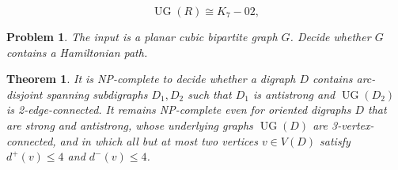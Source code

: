\documentclass[10pt,a4paper]{amsart}
\newtheorem{problem}{Problem}
\newtheorem{theorem}{Theorem}
\newcommand{\UG}{\operatorname{UG}}
\begin{document}
\begin{equation}\label{eq:underlying-core}
   \UG(R)\cong K_7-02,
\end{equation}

\begin{problem}
\label{prob:PCBHAM}
The input is a planar cubic bipartite graph $G$. Decide whether $G$ contains a Hamiltonian path.
\end{problem}

\begin{theorem}\label{thm:main-2EC}
It is NP-complete to decide whether a digraph $D$ contains
arc-disjoint spanning subdigraphs $D_1,D_2$ such that $D_1$ is antistrong and $\UG(D_2)$ is 2-edge-connected. It remains NP-complete even for oriented digraphs $D$ that are strong and antistrong, whose underlying graphs $\UG(D)$ are
3-vertex-connected, and in which all but at most two vertices $v\in V(D)$ satisfy
$d^+(v)\leq4$ and $d^-(v)\leq4$.
\end{theorem}
\end{document}
